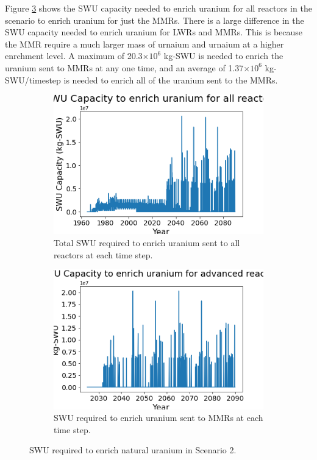 Figure \ref{fig:swu_2} shows the \gls{SWU} capacity needed to 
enrich uranium for all reactors in the scenario to enrich uranium for 
just the \glspl{MMR}. There is a large difference in the \gls{SWU} 
capacity needed to enrich uranium for \glspl{LWR} and \glspl{MMR}. This 
is because the \gls{MMR} require a much larger mass of urnaium and 
urnaium at a higher enrchment level. A maximum of 20.3$\times 10^6$ kg-\gls{SWU}
is needed to enrich the uranium sent to \glspl{MMR} at any one time, and 
an average of 1.37$\times 10^6$ kg-\gls{SWU}/timestep is needed to enrich all of the 
uranium sent to the \glspl{MMR}. 


\begin{figure}
    \centering
    \begin{subfigure}{0.4\textwidth}
        \centering
        \includegraphics[scale=0.3]{figures/totalswu_scenarios_2.png}
        \caption{Total \gls{SWU} required to enrich uranium sent to all reactors at each time step.}
        \label{fig:totalswu_2}
    \end{subfigure}
    \begin{subfigure}{0.4\textwidth}
        \centering
        \includegraphics[scale=0.3]{figures/haleuSWU_scenarios_2.png}
        \caption{\gls{SWU} required to enrich uranium sent to \glspl{MMR} at each time step.}
        \label{fig:haleuswu_2}
    \end{subfigure}
    \caption{\gls{SWU} required to enrich natural uranium in Scenario 2.}
    \label{fig:swu_2}
\end{figure}

